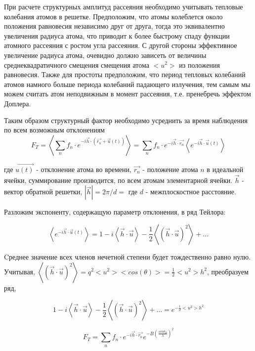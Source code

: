 
При расчете структурных амплитуд рассеяния необходимо учитывать
тепловые колебания атомов в решетке. Предположим, что атомы колеблется около положения
равновесия независимо друг от друга, тогда это эквивалентно увеличения радиуса атома,
что приводит к более быстрому спаду функции атомного рассеяния с ростом угла рассеяния.
С другой стороны эффективное увеличение радиуса атома, очевидно должно зависеть от
величины среднеквадратичного смещения смещения атома  $<u^2>$ из положения равновесия.
Также для простоты предположим, что период тепловых колебаний атомов намного больше периода
колебаний падающего излучения, тем самым мы можем считать атом неподвижным в момент рассеяния,
т.е. пренебречь эффектом Доплера.

Таким образом структурный фактор необходимо усреднить за время наблюдения по всем возможным отклонениям
\begin{equation}
  F_T = \left\langle \sum_{n} f_n \cdot  e^{-i\vec {h} \cdot (\vec{r_n}+ \vec{u}(t))} \right\rangle =  \sum_{n} f_n \cdot  e^{-i\vec {h} \cdot \vec{r_n}}  \left\langle e^{-i \vec{h} \cdot \vec {u}(t)  } \right\rangle
 \end{equation}

где $\vec{u(t)}$ - отклонение атома во времени, $\vec{r_n}$ - положение атома $n$
в идеальной ячейки, суммирование производится, по всем атомам элементарной ячейки.
$\vec{h}$ - вектор обратной решетки, $|\vec{h}| = 2 \pi / d = $ где $d$ - межплоскостное расстояние.

Разложим экспоненту, содержащую параметр отклонения, в ряд Тейлора:

\begin{equation}
  \left\langle e^{-i \vec{h} \cdot \vec {u}(t)  } \right\rangle = 1 - i  \left\langle \vec{h} \cdot \vec {u} \right\rangle - \frac{1}{2} \left\langle (\vec{h} \cdot \vec {u})^2 \right\rangle+ \ldots
 \end{equation}

 Cреднее значение всех членов нечетной степени будет тождественно равно нулю.
Учитывая,  $ \left\langle (\vec{h} \cdot \vec {u})^2 \right\rangle = q^2 <u^2> <cos(\theta)> = \frac{1}{2}<u^2>h^2$, преобразуем ряд,

\begin{equation}
1 - i  \left\langle \vec{h} \cdot \vec {u} \right\rangle - \frac{1}{2} \left\langle (\vec{h} \cdot \vec {u})^2 \right\rangle+ \ldots = e^{-\frac{1}{2} <u^2> h^2}
 \end{equation}


 \begin{equation}
   F_T =  \sum_{n} f_n \cdot  e^{-i\vec {h} \cdot \vec{r_n}}  e^{-B (\frac{sin\theta_B}{\lambda} )^2 }
  \end{equation}

